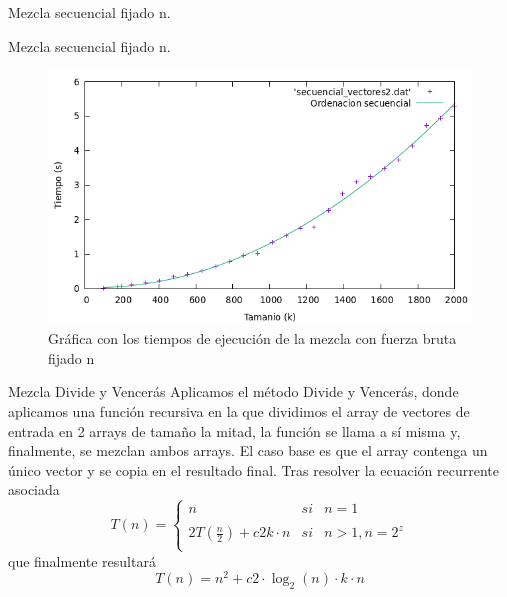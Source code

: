 \documentclass[10pt, xcolor=table]{beamer}
\begin{document}
\begin{frame}[fragile]{Mezcla secuencial fijado n. }
	\begin{table}[h!]
		\centering
		\footnotesize
		\caption{Experiencia empírica de la mezcla con fuerza bruta fijado n}
	\end{table}
\end{frame}


\begin{frame}[fragile]{Mezcla secuencial fijado n. }
\begin{figure}[h!]
	\centering
	\includegraphics[scale=0.45]{./Images/Grafica_eje2_fijonsec.png}
	\caption{Gráfica con los tiempos de ejecución de la mezcla con fuerza bruta fijado n}
\end{figure}
\end{frame}




\begin{frame}[fragile]{Mezcla Divide y Vencerás}
Aplicamos el método Divide y Vencerás, donde aplicamos una función recursiva en la que dividimos el array de vectores de entrada en 2 arrays de tamaño la mitad, la función se llama a sí misma y, finalmente, se mezclan ambos arrays. El caso base es que el array contenga un único vector y se copia en el resultado final. Tras resolver la ecuación recurrente asociada
\[
 	T(n)= \left\{ \begin{array}{lcc}
             n  &   si  & n = 1 \\
             \\ 2T(\frac{n}{2}) + c2k \cdot n &  si & n > 1, n=2^z \\
             \end{array}
   \right.
 \]
  que finalmente resultará
  \[
 	T(n) =  n^2 + c2\cdot\log_{2}(n) \cdot k \cdot n
 \]

\end{frame}
\end{document}
